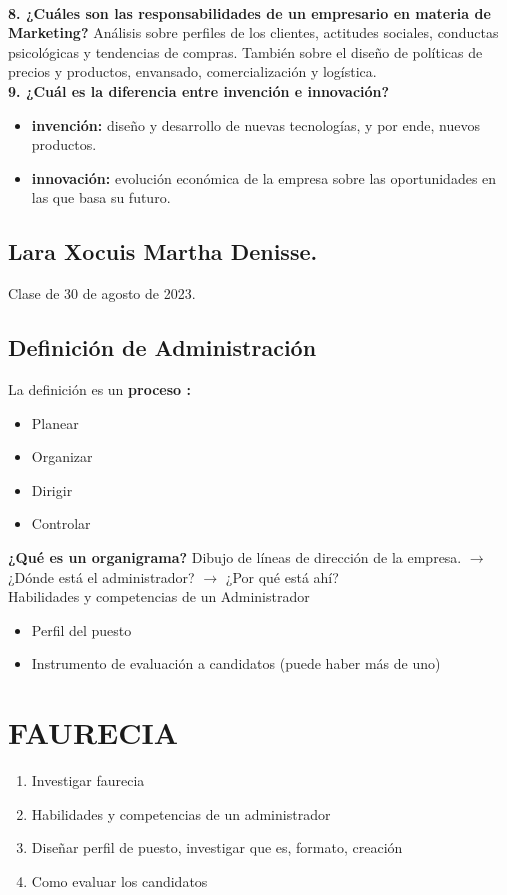 \documentclass[letterpaper,12pt]{article}
\begin{document}
\begin{sloppypar}
\vspace{0.3cm}\\ 
\textbf{8. ¿Cuáles son las responsabilidades de un empresario en materia de Marketing? } Análisis sobre perfiles de los clientes, actitudes sociales, conductas psicológicas y tendencias de compras. También sobre el diseño de políticas de precios y productos, envansado, comercialización y logística.
\vspace{0.3cm}\\ 
\textbf{9. ¿Cuál es la diferencia entre invención e innovación? }
\begin{itemize}
    \item \textbf{invención:} diseño y desarrollo de nuevas tecnologías, y por ende, nuevos productos. 
    \item \textbf{innovación:} evolución económica de la empresa sobre las oportunidades en las que basa su futuro.
\end{itemize}

\newpage
\subsection*{Lara Xocuis Martha Denisse.}
Clase de 30 de agosto de 2023.

\textcolor[rgb]{0.5,0.5,0.3}{\section*{Definición de Administración}}
La definición es un \textbf{proceso : }
\begin{itemize}
    \item Planear 
    \item Organizar 
    \item Dirigir
    \item Controlar 
\end{itemize}

\textbf{¿Qué es un organigrama?} Dibujo de líneas de dirección de la empresa. $\longrightarrow$ ¿Dónde está el administrador? $\longrightarrow$ ¿Por qué está ahí?
\vspace{0.3cm}\\ 
Habilidades y competencias de un Administrador 
\begin{itemize}
    \item Perfil del puesto 
    \item Instrumento de evaluación a candidatos (puede haber más de uno)
\end{itemize}

\section*{FAURECIA}
\begin{enumerate}
    \item Investigar faurecia
    \item Habilidades y competencias de un administrador
    \item Diseñar perfil de puesto, investigar que es, formato, creación
    \item Como evaluar los candidatos   
\end{enumerate}


\end{sloppypar}
\end{document}
